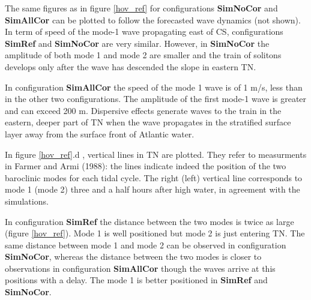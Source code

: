The same figures as in figure \ref{hov_ref} for configurations \textbf{SimNoCor} and \textbf{SimAllCor} can be plotted to follow the forecasted wave dynamics (not shown). In term of speed of the mode-1 wave propagating east of CS, configurations \textbf{SimRef} and \textbf{SimNoCor} are very similar. However, in \textbf{SimNoCor} the amplitude of both mode 1 and mode 2 are smaller and the train of solitons develops only after the wave has descended the slope in eastern TN.

In configuration \textbf{SimAllCor} the speed of the mode 1 wave is of 1 m/s, less than in the other two configurations. The amplitude of the first mode-1 wave is greater and can exceed 200 m. Dispersive effects generate waves to the train in the eastern, deeper part of TN when the wave propagates in the stratified surface layer away from the surface front of Atlantic water.


In figure \ref{hov_ref}.d %
, vertical lines in TN are plotted. They refer to measurments in Farmer and Armi (1988): the lines indicate indeed the position of the two baroclinic modes for each tidal cycle. The right (left) vertical line corresponds to mode 1 (mode 2) three and a half hours after high water, in agreement with the simulations.

In configuration \textbf{SimRef} the distance between the two modes is twice as large (figure \ref{hov_ref}). Mode 1 is well positioned but mode 2 is just entering TN. The same distance between mode 1 and mode 2 can be observed in configuration \textbf{SimNoCor}, whereas the distance between the two modes is closer to observations in configuration \textbf{SimAllCor} though the waves arrive at this positions with a delay. The mode 1 is better positioned in \textbf{SimRef} and \textbf{SimNoCor}.

